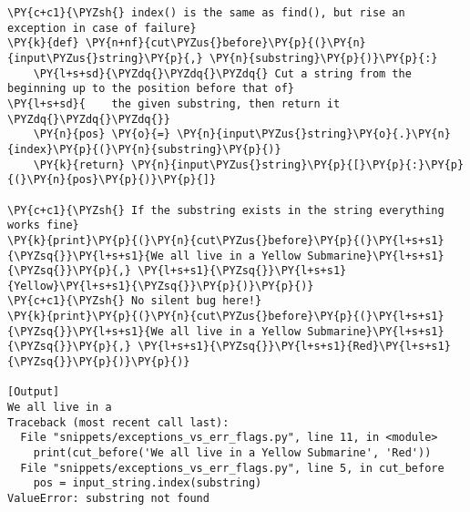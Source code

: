 \begin{Verbatim}[label=\makebox{\url{https://github.com/lucabaldini/cmepda/tree/master/slides/latex/snippets/exceptions\_vs\_err\_flags.py}},commandchars=\\\{\}]
\PY{c+c1}{\PYZsh{} index() is the same as find(), but rise an exception in case of failure}
\PY{k}{def} \PY{n+nf}{cut\PYZus{}before}\PY{p}{(}\PY{n}{input\PYZus{}string}\PY{p}{,} \PY{n}{substring}\PY{p}{)}\PY{p}{:}
    \PY{l+s+sd}{\PYZdq{}\PYZdq{}\PYZdq{} Cut a string from the beginning up to the position before that of}
\PY{l+s+sd}{    the given substring, then return it \PYZdq{}\PYZdq{}\PYZdq{}}
    \PY{n}{pos} \PY{o}{=} \PY{n}{input\PYZus{}string}\PY{o}{.}\PY{n}{index}\PY{p}{(}\PY{n}{substring}\PY{p}{)}
    \PY{k}{return} \PY{n}{input\PYZus{}string}\PY{p}{[}\PY{p}{:}\PY{p}{(}\PY{n}{pos}\PY{p}{)}\PY{p}{]}

\PY{c+c1}{\PYZsh{} If the substring exists in the string everything works fine}
\PY{k}{print}\PY{p}{(}\PY{n}{cut\PYZus{}before}\PY{p}{(}\PY{l+s+s1}{\PYZsq{}}\PY{l+s+s1}{We all live in a Yellow Submarine}\PY{l+s+s1}{\PYZsq{}}\PY{p}{,} \PY{l+s+s1}{\PYZsq{}}\PY{l+s+s1}{Yellow}\PY{l+s+s1}{\PYZsq{}}\PY{p}{)}\PY{p}{)}
\PY{c+c1}{\PYZsh{} No silent bug here!}
\PY{k}{print}\PY{p}{(}\PY{n}{cut\PYZus{}before}\PY{p}{(}\PY{l+s+s1}{\PYZsq{}}\PY{l+s+s1}{We all live in a Yellow Submarine}\PY{l+s+s1}{\PYZsq{}}\PY{p}{,} \PY{l+s+s1}{\PYZsq{}}\PY{l+s+s1}{Red}\PY{l+s+s1}{\PYZsq{}}\PY{p}{)}\PY{p}{)}

[Output]
We all live in a 
Traceback (most recent call last):
  File "snippets/exceptions_vs_err_flags.py", line 11, in <module>
    print(cut_before('We all live in a Yellow Submarine', 'Red'))
  File "snippets/exceptions_vs_err_flags.py", line 5, in cut_before
    pos = input_string.index(substring)
ValueError: substring not found
\end{Verbatim}